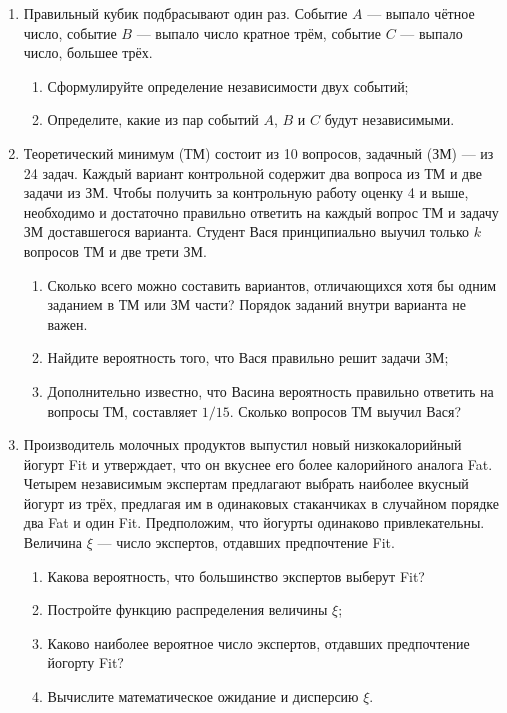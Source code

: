 \begin{enumerate}

\item Правильный кубик подбрасывают один раз. Событие $A$ — выпало чётное число, событие $B$ — выпало число кратное трём, событие $C$ — выпало число, большее трёх.

\begin{enumerate}
\item Сформулируйте определение независимости двух событий;
\item Определите, какие из пар событий $A$, $B$ и $C$ будут независимыми.
\end{enumerate}


\item Теоретический минимум (ТМ) состоит из 10 вопросов, задачный (ЗМ) — из 24 задач.
Каждый вариант контрольной содержит два вопроса из ТМ и две задачи из ЗМ.
Чтобы получить за контрольную работу оценку 4 и выше, необходимо и достаточно правильно ответить на каждый вопрос ТМ и задачу ЗМ доставшегося варианта. Студент Вася принципиально выучил только $k$ вопросов ТМ и две трети ЗМ.
\begin{enumerate}
\item Сколько всего можно составить вариантов, отличающихся хотя бы одним заданием в ТМ или ЗМ части? Порядок заданий внутри варианта не важен.
\item Найдите вероятность того, что Вася правильно решит задачи ЗМ;
\item Дополнительно известно, что Васина вероятность правильно ответить на вопросы ТМ, составляет $1/15$. Сколько вопросов ТМ выучил Вася?
\end{enumerate}

\item Производитель молочных продуктов выпустил новый низкокалорийный йогурт Fit и утверждает, что он вкуснее его более калорийного аналога Fat.
Четырем независимым экспертам предлагают выбрать наиболее вкусный йогурт из трёх, предлагая им в одинаковых стаканчиках в случайном порядке два Fat и один Fit.
Предположим, что йогурты одинаково привлекательны.
Величина $\xi$ — число экспертов, отдавших предпочтение Fit.
\begin{enumerate}
\item Какова вероятность, что большинство экспертов выберут Fit?
\item Постройте функцию распределения величины $\xi$;
\item Каково наиболее вероятное число экспертов, отдавших предпочтение йогорту Fit?
\item Вычислите математическое ожидание и дисперсию $\xi$.
\end{enumerate}


\end{enumerate}
